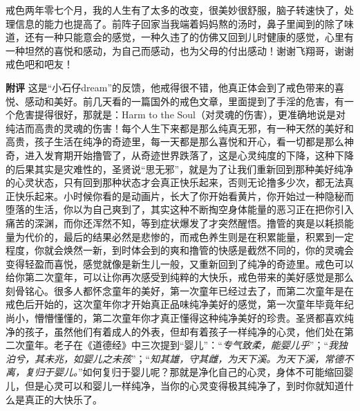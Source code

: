\begin{case}
    戒色两年零七个月，我的人生有了太多的改变，很美妙很舒服，脑子转速快了，处理信息的能力也提高了。前阵子回家当我端着妈妈熬的汤时，鼻子里闻到的除了味道，还有一种只能意会的感觉，一种久违了的仿佛又回到儿时健康的感觉，心里有一种坦然的喜悦和感动，为自己而感动，也为父母的付出感动！谢谢飞翔哥，谢谢戒色吧和吧友！

    \textbf{附评} 这是“小石仔dream”的反馈，他戒得很不错，他真正体会到了戒色带来的喜悦、感动和美好。前几天看的一篇国外的戒色文章，里面提到了手淫的危害，有一个危害提得很好，那就是：Harm to the Soul（对灵魂的伤害），更准确地说是对纯洁而高贵的灵魂的伤害！每个人生下来都是那么纯真无邪，有一种天然的美好和高贵，孩子生活在纯净的奇迹里，每一天都是那么喜悦和开心，看一切都是那么神奇，进入发育期开始撸管了，从奇迹世界跌落了，这是心灵纯度的下降，这种下降的后果其实是灾难性的，圣贤说“思无邪”，就是为了让我们重新回到那种美好纯净的心灵状态，只有回到那种状态才会真正快乐起来，否则无论撸多少次，都无法真正快乐起来。小时候你看的是动画片，长大了你开始看黄片，你开始过一种隐秘而堕落的生活，你以为自己爽到了，其实这种不断掏空身体能量的恶习正在把你引入痛苦的深渊，而你还浑然不知，等到症状爆发了才突然醒悟。撸管的爽是以耗损能量为代价的，最后的结果必然是悲惨的，而戒色养生则是在积累能量，积累到一定程度，你就会焕然一新，到时体会到的爽和撸管的快感是截然不同的，你的灵魂会变得轻盈而喜悦，感觉就像是新生儿一般，又重新回到了纯净的奇迹里。戒色可以给你第二次童年，可以让你再次感受到纯粹的大快乐，戒色带来的美好感觉是那么刻骨铭心。很多人都怀念童年的美好，第一次童年已经过去了，而第二次童年是在戒色后开始的，这次童年你才开始真正品味纯净美好的感觉，第一次童年毕竟年纪尚小，懵懵懂懂的，第二次童年你才真正懂得这种纯净美好的珍贵。圣贤都喜欢纯净的孩子，虽然他们有着成人的外表，但却有着孩子一样纯净的心灵，他们处在第二次童年。老子在《道德经》中三次提到“婴儿”：“\textit{专气致柔，能婴儿乎}”；“\textit{我独泊兮，其未兆，如婴儿之未孩}”；“\textit{知其雄，守其雌，为天下溪。为天下溪，常德不离，复归于婴儿。}”如何复归于婴儿呢？那就是净化自己的心灵，身体不可能缩回婴儿，但是心灵可以和婴儿一样纯净，当你的心灵变得极其纯净了，到时你就知道什么是真正的大快乐了。
\end{case}

